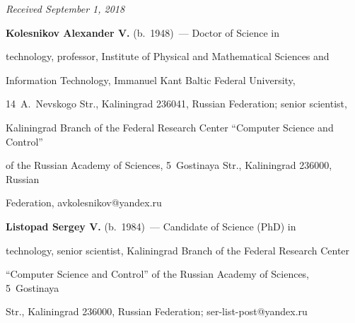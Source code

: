 \vspace*{-3pt}





\hfill{\small\textit{Received September 1, 2018}} 


  


  \Contr


  


  \noindent


  \textbf{Kolesnikov Alexander V.} (b.\ 1948)~--- Doctor of Science in 


technology, professor, Institute of Physical and Mathematical Sciences and 


Information Technology, Immanuel Kant Baltic Federal University, 


14~A.~Nevskogo Str., Kaliningrad 236041, Russian Federation; senior scientist, 


Kaliningrad Branch of the Federal Research Center ``Computer Science and Control'' 


of the Russian Academy of Sciences, 5~Gostinaya Str., Kaliningrad 236000, Russian 


Federation, \mbox{avkolesnikov@yandex.ru}


  


  \vspace*{3pt}


  


  \noindent


  \textbf{Listopad Sergey V.} (b.\ 1984)~--- Candidate of  Science (PhD) in 


technology, senior scientist, Kaliningrad Branch of the Federal Research Center 


``Computer Science and Control'' of the Russian Academy of Sciences, 5~Gostinaya 


Str., Kaliningrad 236000, Russian Federation; \mbox{ser-list-post@yandex.ru} 


\label{end\stat}








\renewcommand{\bibname}{\protect\rm Литература}


